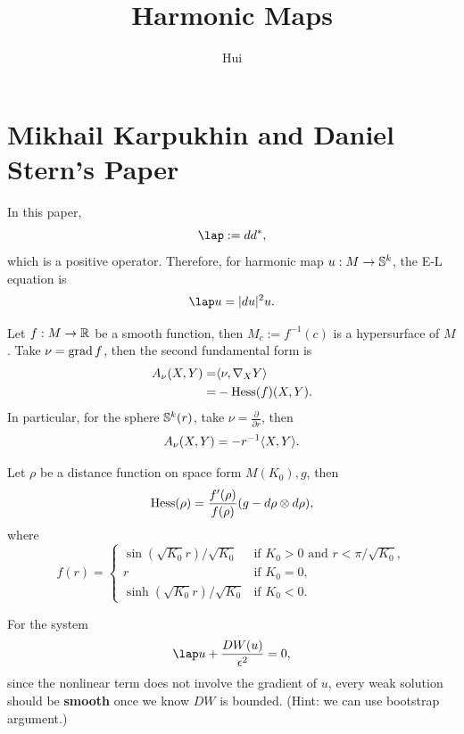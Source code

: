 \documentclass[a4paper,12pt]{article}
\begin{document}
\title{Harmonic Maps}
\author{Hui}
\maketitle




\tableofcontents


\section{Mikhail Karpukhin and Daniel Stern's Paper}
\np In this paper, 
$$ \lap := d d^{*}, $$
which is a positive operator.
Therefore, for harmonic map $u:M \to \ss^k$, the E-L equation is 
$$ \lap u =|du|^2u. $$ 

\begin{example}
    Let $f:M \to \rr$ be a smooth function, then $M_c:= f^{-1}(c)$ is a hypersurface of $M$. Take $\nu=\grad f$, then the second fundamental form is 
    $$ \begin{aligned}
        A_{\nu }(X,Y)=&\la \nu ,\nabla _X Y  \ra\\
        =& -\hess(f)(X,Y).
    \end{aligned}  $$
In particular, for the sphere $\ss^k(r)$, take $\nu =\frac{\partial }{\partial r}$, then 
\begin{equation}
    A_{\nu }(X,Y)=-r^{-1}\la X,Y  \ra.
\end{equation}  
\end{example}

\begin{example}
    Let $\rho $ be a distance function on space form $M(K_0),g$, then 
    \begin{equation}
        \hess (\rho )=\frac{f'(\rho )}{f(\rho )}(g-d \rho \otimes d \rho ),
    \end{equation}   
    where 
    $$ f(r)= \begin{cases}
        \sin(\sqrt{K_0}r)/ \sqrt{K_0} &\text{if } K_0 >0 \text{ and } r < \pi/\sqrt{K_0},\\
        r &\text{if } K_0 =0, \\
        \sinh(\sqrt{K_0}r)/ \sqrt{K_0} &\text{if } K_0 <0.
    \end{cases}  $$
\end{example}


\np 
For the system 
$$ \lap u +  \frac{DW(u)}{\epsilon ^2}=0,$$
since  the nonlinear term does not involve the gradient of $u$, every weak solution should be \textbf{smooth} once we know $DW$ is bounded.   (Hint: we can use bootstrap argument.)
\end{document}
